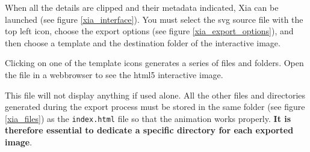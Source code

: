 When all the details are clipped and their metadata indicated, Xia can be launched (see figure \ref{xia_interface}).
You must select the svg source file with the top left icon,
choose the export options (see figure \ref{xia_export_options}), and then choose a 
template and the destination folder of the interactive image.


Clicking on one of the template icons generates a series of files and folders.
 Open the  file in a 
  webbrowser to see the html5 interactive image.

\begin{alert}
This file will not display anything if used 
alone. All the other files and directories generated during the export process 
must be stored in  the same folder (see figure \ref{xia_files}) 
as the \texttt{index.html} file so that the animation works properly.
\textbf{It is therefore essential to 
dedicate a specific directory for each exported image}.
\end{alert}



